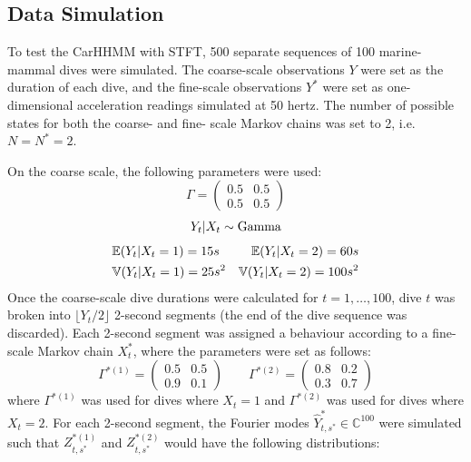 

\subsection{Data Simulation}

To test the CarHHMM with STFT, 500 separate sequences of 100 marine-mammal dives were simulated. The coarse-scale observations $Y$ were set as the duration of each dive, and the fine-scale observations $Y^*$ were set as one-dimensional acceleration readings simulated at 50 hertz. The number of possible states for both the coarse- and fine- scale Markov chains was set to 2, i.e. $N = N^* = 2$. 

On the coarse scale, the following parameters were used:
$$\Gamma = \begin{pmatrix} 0.5 & 0.5 \\ 0.5 & 0.5 \end{pmatrix} $$
$$Y_t|X_t \sim \rm{Gamma} $$
\begin{align*}
	&\mathbb{E}(Y_t|X_t = 1) = 15 s &\mathbb{E}(Y_t|X_t = 2) = 60 s \\
	&\mathbb{V}(Y_t|X_t = 1) = 25 s^2 &\mathbb{V}(Y_t|X_t = 2) = 100 s^2
\end{align*}
Once the coarse-scale dive durations were calculated for $t = 1, \ldots, 100$, dive $t$ was broken into $\lfloor Y_t/2 \rfloor$ 2-second segments (the end of the dive sequence was discarded). Each 2-second segment was assigned a behaviour according to a fine-scale Markov chain $X^*_t$, where the parameters were set as follows:
%
$$\Gamma^{*(1)} = \begin{pmatrix} 0.5 & 0.5 \\ 0.9 & 0.1 \end{pmatrix} \qquad 	\Gamma^{*(2)} = \begin{pmatrix} 0.8 & 0.2 \\ 0.3 & 0.7 \end{pmatrix}$$
%
where $\Gamma^{*(1)}$ was used for dives where $X_t = 1$ and $\Gamma^{*(2)}$ was used for dives where $X_t = 2$. For each 2-second segment, the Fourier modes $\hat{Y}^*_{t,s^*} \in \mathbb{C}^{100}$ were simulated such that $Z^{*(1)}_{t,s^*}$ and $Z^{*(2)}_{t,s^*}$ would have the following distributions: 

